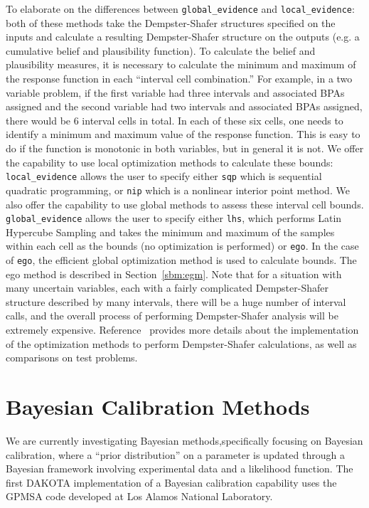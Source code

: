 To elaborate on the differences between \texttt{global\_evidence}
and \texttt{local\_evidence}: both of these methods
take the Dempster-Shafer structures specified on the inputs 
and calculate a resulting Dempster-Shafer structure on the 
outputs (e.g. a cumulative belief and plausibility function). 
To calculate the belief and plausibility measures, it is 
necessary to calculate the minimum and maximum of the response function 
in each ``interval cell combination.''  For example, in a two variable 
problem, if the first variable had three intervals and associated BPAs 
assigned and the second variable had two intervals and associated 
BPAs assigned, there would be 6 interval cells in total. 
In each of these six cells, one needs to identify a minimum and 
maximum value of the response function.  This is easy to do if 
the function is monotonic in both variables, but in general 
it is not.  We offer the capability to use local optimization 
methods to calculate these bounds: \texttt{local\_evidence}
allows the user to specify either \texttt{sqp} which is sequential 
quadratic programming, or \texttt{nip} which is a nonlinear interior point 
method.  We also offer the capability to use global methods to 
assess these interval cell bounds. \texttt{global\_evidence}
allows the user to specify either \texttt{lhs}, which performs 
Latin Hypercube Sampling and takes the minimum and maximum of 
the samples within each cell as the bounds (no optimization is 
performed) or \texttt{ego}.  In the case of \texttt{ego}, 
the efficient global optimization method is used to calculate 
bounds.  The ego method is described in Section~\ref{sbm:egm}.
Note that for a situation with many uncertain variables, 
each with a fairly complicated Dempster-Shafer structure 
described by many intervals, there will be a huge number 
of interval calls, and the overall process of performing 
Dempster-Shafer analysis will be extremely expensive. 
Reference~\cite{Tang10b} provides more details about 
the implementation of the optimization methods to perform 
Dempster-Shafer calculations, as well as comparisons on test problems.

\section{Bayesian Calibration Methods}\label{uq:bayesian}
We are currently investigating Bayesian methods,specifically focusing on 
Bayesian calibration, where a ``prior distribution'' on a parameter is 
updated through a Bayesian framework involving experimental data and 
a likelihood function. The first DAKOTA implementation of a Bayesian 
calibration capability uses the GPMSA code developed at 
Los Alamos National Laboratory.

